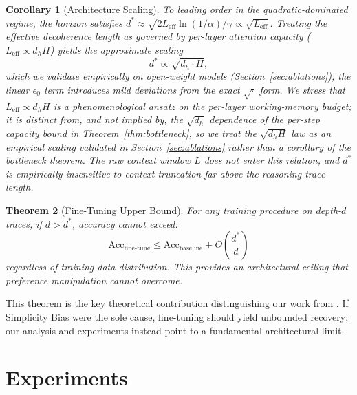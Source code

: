 \documentclass{article}
\theoremstyle{plain}
\newtheorem{theorem}{Theorem}[section]
\newtheorem{corollary}[theorem]{Corollary}
\theoremstyle{definition}
\theoremstyle{remark}
\newcommand{\Leff}{L_{\mathrm{eff}}}
\begin{document}
\begin{corollary}[Architecture Scaling]
\label{cor:scaling}
To leading order in the quadratic-dominated regime, the horizon satisfies $d^* \approx \sqrt{2\Leff \ln(1/\alpha)/\gamma} \propto \sqrt{\Leff}$. Treating the effective decoherence length as governed by per-layer attention capacity ($\Leff \propto d_h H$) yields the approximate scaling
\begin{equation}
d^* \propto \sqrt{d_h \cdot H},
\end{equation}
which we validate empirically on open-weight models (Section~\ref{sec:ablations}); the linear $\epsilon_0$ term introduces mild deviations from the exact $\sqrt{\cdot}$ form. We stress that $\Leff \propto d_h H$ is a phenomenological ansatz on the per-layer working-memory budget; it is distinct from, and not implied by, the $\sqrt{d_h}$ dependence of the per-step capacity bound in Theorem~\ref{thm:bottleneck}, so we treat the $\sqrt{d_h H}$ law as an empirical scaling validated in Section~\ref{sec:ablations} rather than a corollary of the bottleneck theorem. The raw context window $L$ does not enter this relation, and $d^*$ is empirically insensitive to context truncation far above the reasoning-trace length.
\end{corollary}

\begin{theorem}[Fine-Tuning Upper Bound]
\label{thm:finetune}
For any training procedure on depth-$d$ traces, if $d > d^*$, accuracy cannot exceed:
\begin{equation}
\text{Acc}_{\text{fine-tune}} \leq \text{Acc}_{\text{baseline}} + O\left(\frac{d^*}{d}\right)
\end{equation}
regardless of training data distribution. This provides an \emph{architectural ceiling} that preference manipulation cannot overcome.
\end{theorem}

This theorem is the key theoretical contribution distinguishing our work from \citet{wu2025more}. If Simplicity Bias were the sole cause, fine-tuning should yield unbounded recovery; our analysis and experiments instead point to a fundamental architectural limit.


\section{Experiments}
\label{sec:experiments}
\end{document}
